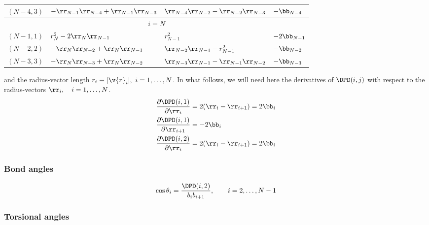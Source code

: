 \begin{table}[ht]
\begin{tabular}{|p{2cm}|p{4cm}|p{4cm}|p{2.5cm}|}
    \hline
    $(N-4,3)$		& $-\rr_{N-1}\rr_{N-4}+\rr_{N-1}\rr_{N-3}$ 
    			& $\rr_{N-4}\rr_{N-2}-\rr_{N-2}\rr_{N-3}$
			& $-\bb_{N-4}$	\\
\hline
\multicolumn{4}{|c|}{$i=N$} \\ 
\hline
$(N-1,1)$ 	& $r_{N}^2-2\rr_{N}\rr_{N-1}$	
    		& $r_{N-1}^2$ 
		& $-2\bb_{N-1}$\\
\hline
$(N-2,2)$ 	& $-\rr_N\rr_{N-2}+\rr_N\rr_{N-1}$ 
    		& $\rr_{N-2}\rr_{N-1}-r_{N-1}^2$ 
		& $-\bb_{N-2}$\\
\hline
$(N-3,3)$	& $-\rr_N\rr_{N-3}+\rr_N\rr_{N-2}$ 
    		& $\rr_{N-3}\rr_{N-1}-\rr_{N-1}\rr_{N-2}$
		& $-\bb_{N-3}$	\\
\hline
  \end{tabular}
\end{table}

and the radius-vector length $r_i\equiv|\v{r}_i|,\ i=1,\ldots,N$. 
In what follows, we will need here the derivatives 
of $\DPD(i,j)$ with respect to the radius-vectors $\rr_i,\quad i=1,\ldots,N$.
\begin{align}
  \frac{\partial\DPD(i,1)}{\partial \rr_i}&=2(\rr_i-\rr_{i+1})=2\bb_i\\
  \frac{\partial\DPD(i,1)}{\partial \rr_{i+1}}&=-2\bb_i\\
  \frac{\partial\DPD(i,2)}{\partial \rr_i}&=2(\rr_i-\rr_{i+1})=2\bb_i\\
\end{align}

\subsubsection{Bond angles}

\begin{equation}
  \cos\theta_i=\frac{\DPD(i,2)}{b_ib_{i+1}},\qquad i=2,\ldots,N-1  
  \label{bln-bangle}
\end{equation}

\subsubsection{Torsional angles}

